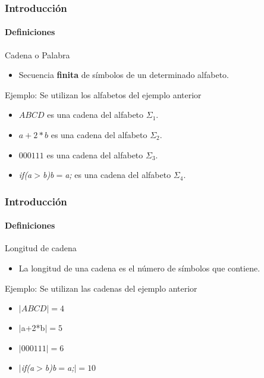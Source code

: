 \documentclass{beamer}
\begin{document}
        \begin{frame}
            \frametitle{Introducci\'on}
            \framesubtitle{Definiciones}

            \begin{block}{Cadena o Palabra}
                \begin{itemize}
                    \item[\checkmark] Secuencia \textbf{finita} de s\'imbolos de un determinado alfabeto.
                \end{itemize}
            \end{block}
            \begin{exampleblock}{Ejemplo: Se utilizan los alfabetos del ejemplo anterior}
                \begin{itemize}
                    \item[\checkmark] $ABCD$ es una cadena del alfabeto $\Sigma_{1}$.
                    \item[\checkmark] $a+2*b$ es una cadena del alfabeto $\Sigma_{2}$.
                    \item[\checkmark] $000111$ es una cadena del alfabeto $\Sigma_{3}$.
                    \item[\checkmark] \emph{if(a}$>$\emph{b)b}$=$\emph{a;} es una cadena del alfabeto $\Sigma_{4}$.
                \end{itemize}
			\end{exampleblock}
		\end{frame}        

        \begin{frame}
            \frametitle{Introducci\'on}
            \framesubtitle{Definiciones}

            \begin{block}{Longitud de cadena}
                \begin{itemize}
                    \item[\checkmark] La longitud de una cadena es el n\'umero de s\'imbolos que contiene.
                \end{itemize}
            \end{block}
            \begin{exampleblock}{Ejemplo: Se utilizan las cadenas del ejemplo anterior}
                \begin{itemize}
                    \item[\checkmark] $|ABCD| = 4$ 
                    \item[\checkmark] $|$a+2*b$| = 5$ 
                    \item[\checkmark] $|000111| = 6$ 
                    \item[\checkmark] $|$\emph{if(a}$>$\emph{b)b}$=$\emph{a;}$| = 10$
                \end{itemize}
			\end{exampleblock}
		\end{frame}        
\end{document}
